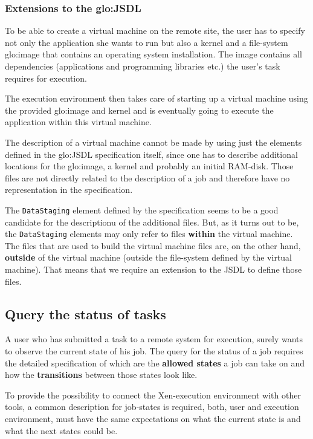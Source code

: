 \subsubsection{Extensions to the \gls{glo:JSDL}}

To be able to create a virtual machine on the remote site, the user has to
specify not only the application she wants  to run but also a kernel and a
file-system   \gls{glo:image}   that    contains   an   operating   system
installation.   The  image  contains  all dependencies  (applications  and
programming libraries etc.) the user's task requires for execution.

The execution environment then takes care of starting up a virtual machine
using the provided  \gls{glo:image} and kernel and is  eventually going to
execute the application within this virtual machine.

The description  of a  virtual machine  cannot be made  by using  just the
elements defined in the \gls{glo:JSDL} specification itself, since one has
to  describe additional locations  for the  \gls{glo:image}, a  kernel and
probably an initial RAM-disk.  Those files are not directly related to the
description  of  a  job  and  therefore  have  no  representation  in  the
specification.

The \texttt{DataStaging} element defined  by the specification seems to be
a good candidate for the descriptionu  of the additional files. But, as it
turns out to be, the \texttt{DataStaging} elements may only refer to files
\textbf{within} the virtual machine. The  files that are used to build the
virtual  machine files  are, on  the other  hand, \textbf{outside}  of the
virtual  machine  (\ie outside the  file-system  defined  by the  virtual
machine). That  means that we require  an extension to the  JSDL to define
those files.

\subsection{Query the status of tasks}
\label{sec:status-query}

A user who  has submitted a task to a remote  system for execution, surely
wants to observe the current state of his job. The query for the status of
a job requires the detailed specification of which are the \textbf{allowed
  states} a job can take on and how the \textbf{transitions} between those
states look like.

To provide  the possibility to connect the  Xen-execution environment with
other tools,  a common description for job-states  is required, \ie both,
user and  execution environment, must  have the same expectations  on what
the current  state is and  what the next  states could be.


